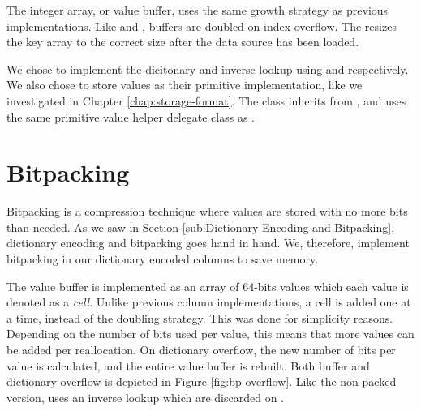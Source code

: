 The integer array, or value buffer, uses the same growth strategy as previous implementations. Like  and , buffers are doubled on index overflow. The  resizes the key array to the correct size after the data source has been loaded.

We chose to implement the dicitonary and inverse lookup using  and  respectively. We also chose to store values as their primitive implementation, like we investigated in Chapter \ref{chap:storage-format}. The class inherits from , and uses the same primitive value helper delegate class as .

\section{Bitpacking}
\label{sec:Bitpacking}
Bitpacking is a compression technique where values are stored with no more bits than needed. As we saw in Section \ref{sub:Dictionary Encoding and Bitpacking}, dictionary encoding and bitpacking goes hand in hand. We, therefore, implement bitpacking in our dictionary encoded columns to save memory.

The value buffer is implemented as an array of 64-bits values which each value is denoted as a \textit{cell}. Unlike previous column implementations, a cell is added one at a time, instead of the doubling strategy. This was done for simplicity reasons. Depending on the number of bits used per value, this means that more values can be added per reallocation. On dictionary overflow, the new number of bits per value is calculated, and the entire value buffer is rebuilt. Both buffer and dictionary overflow is depicted in Figure \ref{fig:bp-overflow}. Like the non-packed version,  uses an inverse lookup which are discarded on .

